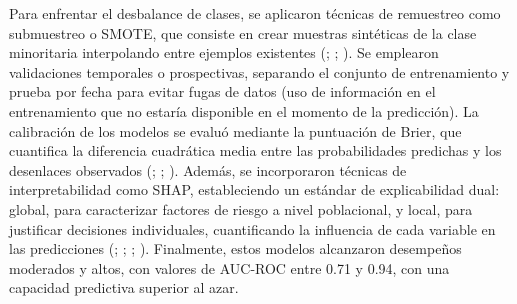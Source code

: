 Para enfrentar el desbalance de clases, se aplicaron técnicas de remuestreo como submuestreo o SMOTE, que consiste en crear muestras sintéticas de la clase minoritaria interpolando entre ejemplos existentes (\cite{article4}; \cite{article6}; \cite{article16}). Se emplearon validaciones temporales o prospectivas, separando el conjunto de entrenamiento y prueba por fecha para evitar fugas de datos (uso de información en el entrenamiento que no estaría disponible en el momento de la predicción). La calibración de los modelos se evaluó mediante la puntuación de Brier, que cuantifica la diferencia cuadrática media entre las probabilidades predichas y los desenlaces observados (\cite{article1}; \cite{article8}; \cite{article9}). Además, se incorporaron técnicas de interpretabilidad como SHAP, estableciendo un estándar de explicabilidad dual: global, para caracterizar factores de riesgo a nivel poblacional, y local, para justificar decisiones individuales, cuantificando la influencia de cada variable en las predicciones (\cite{article1}; \cite{article4}; \cite{article7}; \cite{article11}). Finalmente, estos modelos alcanzaron desempeños moderados y altos, con valores de AUC-ROC entre 0.71 y 0.94, con una capacidad predictiva superior al azar.


